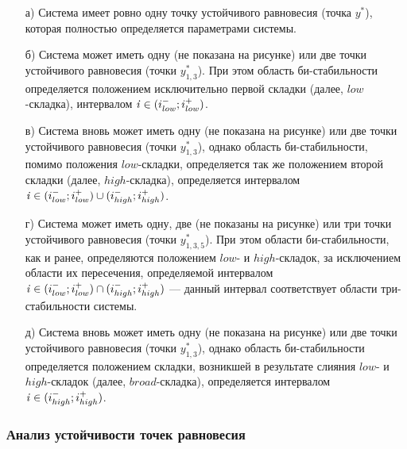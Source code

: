 \begin{itemize}
    \item[а)] Система имеет ровно одну точку устойчивого равновесия (точка $y^{*}$), которая полностью определяется параметрами системы.
    \item[б)] Система может иметь одну (не показана на рисунке) или две точки устойчивого равновесия (точки $y^{*}_{1,3}$). При этом область би-стабильности определяется положением исключительно первой складки (далее, $low$-складка), \ie интервалом $\mathit{i} \in (i_{low}^{-}; i_{low}^{+})$.
    \item[в)] Система вновь может иметь одну (не показана на рисунке) или две точки устойчивого равновесия (точки $y^{*}_{1,3}$), однако область би-стабильности, помимо положения $low$-складки, определяется так же положением второй складки (далее, $high$-складка), \ie определяется интервалом $\mathit{i} \in (i_{low}^{-}; i_{low}^{+}) \cup (i_{high}^{-}; i_{high}^{+})$.
    \item[г)] Система может иметь одну, две (не показаны на рисунке) или три точки устойчивого равновесия (точки $y^{*}_{1,3,5}$). При этом области би-стабильности, как и ранее, определяются положением $low$- и $high$-складок, за исключением области их пересечения, определяемой интервалом $\mathit{i} \in (i_{low}^{-}; i_{low}^{+}) \cap (i_{high}^{-}; i_{high}^{+})$ --- данный интервал соответствует области три-стабильности системы.
    \item[д)] Система вновь может иметь одну (не показана на рисунке) или две точки устойчивого равновесия (точки $y^{*}_{1,3}$), однако область би-стабильности определяется положением складки, возникшей в результате слияния $low$- и $high$-складок (далее, $broad$-складка), \ie определяется интервалом $\mathit{i} \in (i_{high}^{-}; i_{high}^{+})$.
\end{itemize}


\subsubsection{Анализ устойчивости точек равновесия}

